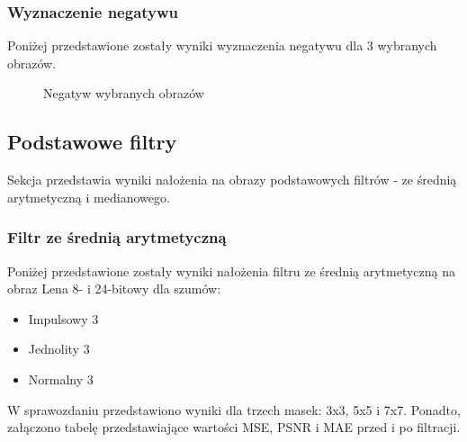 \documentclass{classrep}
\begin{document}
\subsubsection{Wyznaczenie negatywu}
Poniżej przedstawione zostały wyniki wyznaczenia negatywu dla 3 wybranych obrazów.
\begin{figure}[H]%
    \centering
    \qquad
    \qquad
    \caption{Negatyw wybranych obrazów}%
\end{figure}


\subsection{Podstawowe filtry}
Sekcja przedstawia wyniki nałożenia na obrazy podstawowych filtrów - ze średnią arytmetyczną i medianowego.

\subsubsection{Filtr ze średnią arytmetyczną}
Poniżej przedstawione zostały wyniki nałożenia filtru ze średnią arytmetyczną na obraz Lena 8- i 24-bitowy dla szumów:
\begin{itemize}
\item Impulsowy 3
\item Jednolity 3
\item Normalny 3
\end{itemize}
W sprawozdaniu przedstawiono wyniki dla trzech masek: 3x3, 5x5 i 7x7. Ponadto, załączono tabelę przedstawiające wartości MSE, PSNR i MAE przed i po filtracji.
\end{document}
